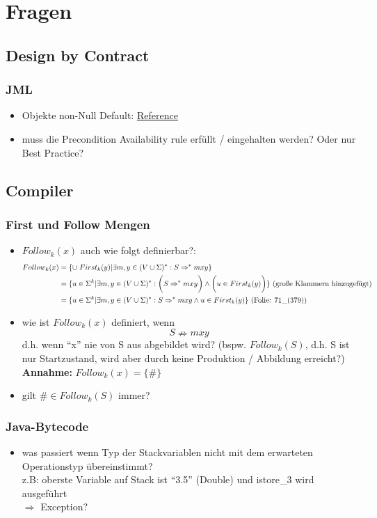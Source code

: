 \chapter{Fragen}
\section{Design by Contract}
\subsection{JML}
\begin{itemize}
	\item Objekte non-Null Default: \href{http://www.eecs.ucf.edu/~leavens/JML/jmlrefman/jmlrefman_2.html#SEC16}{Reference}
	\item muss die Precondition Availability rule  erfüllt / eingehalten werden? Oder nur Best Practice?
\end{itemize}

\section{Compiler}
\subsection{First und Follow Mengen}
\begin{itemize}
	\item $Follow_k(x)$ auch wie folgt definierbar?:
		\begin{align*}
			Follow_k(x) &= \{ \cup\; First_k(y) | \exists m,y \in (V \cup \Sigma)^* : S \Rightarrow^* mxy \}\\
						&= \{ u \in \Sigma^k | \exists m,y \in (V \cup \Sigma)^*: \bigg(S \Rightarrow^* mxy\bigg) \wedge \bigg( u \in First_k(y) \bigg) \} \text{ (große Klammern hinzugefügt)}\\
						&= \{ u \in \Sigma^k | \exists m,y \in (V \cup \Sigma)^*: S \Rightarrow^* mxy \wedge u \in First_k(y) \} \text{ (Folie: $71\_\text{(379)}$)}
		\end{align*}
	\item wie ist $Follow_k(x)$ definiert, wenn 
		$$S \nRightarrow mxy$$
		d.h. wenn \enquote{x} nie von S aus abgebildet wird? (bspw. $Follow_k(S)$, d.h. S ist nur Startzustand, wird aber durch keine Produktion / Abbildung erreicht?)\\
		\textbf{Annahme:} $Follow_k(x) = \{ \# \}$
	\item gilt $\# \in Follow_k(S)$ immer?
\end{itemize}
\subsection{Java-Bytecode}
\begin{itemize}
	\item was passiert wenn Typ der Stackvariablen nicht mit dem erwarteten Operationstyp übereinstimmt?\\
		z.B: oberste Variable auf Stack ist \enquote{3.5} (Double) und istore\_3 wird ausgeführt\\
		$\Rightarrow$ Exception?
\end{itemize}